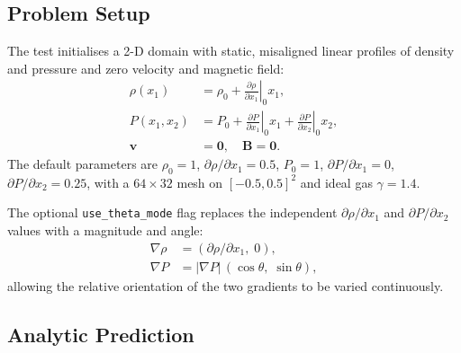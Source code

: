 \documentclass[11pt]{article}
\newcommand{\bv}[1]{\boldsymbol{#1}}
\newcommand{\grad}{\nabla}
\begin{document}
\subsection{Problem Setup}
\label{sec:setup}

The test initialises a 2-D domain with static, misaligned linear profiles of
density and pressure and zero velocity and magnetic field:
\begin{align}
  \rho(x_1) &= \rho_0 + \left.\frac{\partial\rho}{\partial x_1}\right|_0 x_1,
  \label{eq:rho_ic}
  \\
  P(x_1,x_2) &= P_0
    + \left.\frac{\partial P}{\partial x_1}\right|_0 x_1
    + \left.\frac{\partial P}{\partial x_2}\right|_0 x_2,
  \label{eq:p_ic}
  \\
  \bv{v} &= \bv{0}, \quad \bv{B} = \bv{0}.
  \label{eq:vb_ic}
\end{align}
The default parameters are
$\rho_0 = 1$,
$\partial\rho/\partial x_1 = 0.5$,
$P_0 = 1$,
$\partial P/\partial x_1 = 0$,
$\partial P/\partial x_2 = 0.25$,
with a $64\times32$ mesh on $[-0.5,0.5]^2$ and ideal gas $\gamma = 1.4$.

The optional \texttt{use\_theta\_mode} flag replaces the independent
$\partial\rho/\partial x_1$ and $\partial P/\partial x_2$ values with a
magnitude and angle:
\begin{align}
  \grad\rho &= (\partial\rho/\partial x_1,\;0),  \\
  \grad P   &= |\grad P|\,(\cos\theta,\;\sin\theta),
\end{align}
allowing the relative orientation of the two gradients to be varied
continuously.

\subsection{Analytic Prediction}
\label{sec:analytic}
\end{document}
